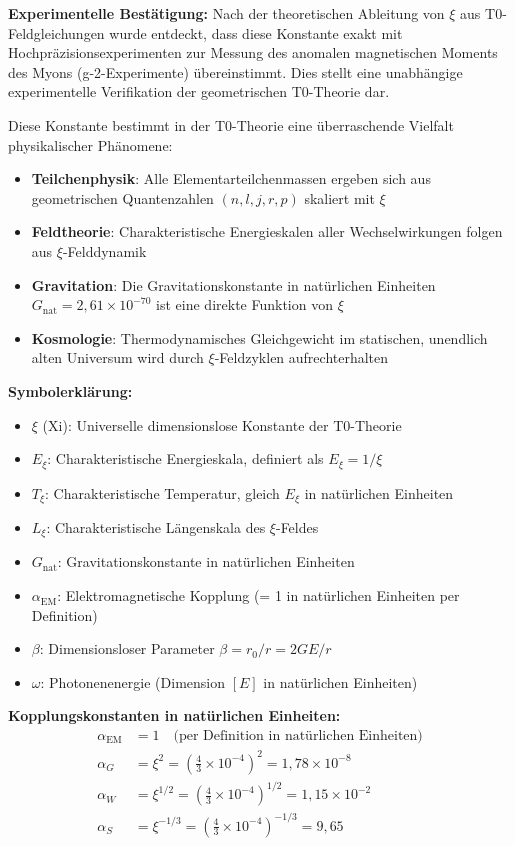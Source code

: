 \documentclass[12pt,a4paper]{article}
\begin{document}
	\textbf{Experimentelle Bestätigung:} Nach der theoretischen Ableitung von $\xi$ aus T0-Feldgleichungen wurde entdeckt, dass diese Konstante exakt mit Hochpräzisionsexperimenten zur Messung des anomalen magnetischen Moments des Myons (g-2-Experimente) übereinstimmt. Dies stellt eine unabhängige experimentelle Verifikation der geometrischen T0-Theorie dar.
	
	Diese Konstante bestimmt in der T0-Theorie eine überraschende Vielfalt physikalischer Phänomene:
	\begin{itemize}
		\item \textbf{Teilchenphysik}: Alle Elementarteilchenmassen ergeben sich aus geometrischen Quantenzahlen $(n,l,j,r,p)$ skaliert mit $\xi$
		\item \textbf{Feldtheorie}: Charakteristische Energieskalen aller Wechselwirkungen folgen aus $\xi$-Felddynamik
		\item \textbf{Gravitation}: Die Gravitationskonstante in natürlichen Einheiten $G_{\text{nat}} = 2{,}61 \times 10^{-70}$ ist eine direkte Funktion von $\xi$
		\item \textbf{Kosmologie}: Thermodynamisches Gleichgewicht im statischen, unendlich alten Universum wird durch $\xi$-Feldzyklen aufrechterhalten
	\end{itemize}
	
	\textbf{Symbolerklärung:}
	\begin{itemize}
		\item $\xi$ (Xi): Universelle dimensionslose Konstante der T0-Theorie
		\item $E_\xi$: Charakteristische Energieskala, definiert als $E_\xi = 1/\xi$
		\item $T_\xi$: Charakteristische Temperatur, gleich $E_\xi$ in natürlichen Einheiten
		\item $L_\xi$: Charakteristische Längenskala des $\xi$-Feldes
		\item $G_{\text{nat}}$: Gravitationskonstante in natürlichen Einheiten
		\item $\alpha_{\text{EM}}$: Elektromagnetische Kopplung (= 1 in natürlichen Einheiten per Definition)
		\item $\beta$: Dimensionsloser Parameter $\beta = r_0/r = 2GE/r$
		\item $\omega$: Photonenenergie (Dimension $[E]$ in natürlichen Einheiten)
	\end{itemize}
	
	\textbf{Kopplungskonstanten in natürlichen Einheiten:}
	\begin{align}
		\alpha_{\text{EM}} &= 1 \quad \text{(per Definition in natürlichen Einheiten)} \\
		\alpha_G &= \xi^2 = \left(\frac{4}{3} \times 10^{-4}\right)^2 = 1{,}78 \times 10^{-8} \\
		\alpha_W &= \xi^{1/2} = \left(\frac{4}{3} \times 10^{-4}\right)^{1/2} = 1{,}15 \times 10^{-2} \\
		\alpha_S &= \xi^{-1/3} = \left(\frac{4}{3} \times 10^{-4}\right)^{-1/3} = 9{,}65
	\end{align}
	
\end{document}
